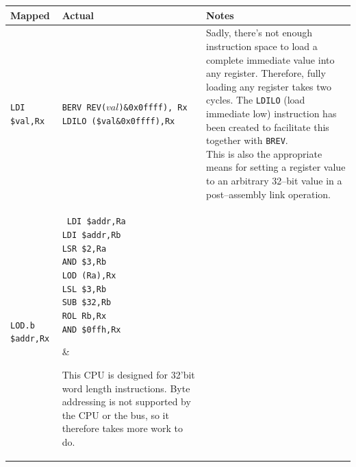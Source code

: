 \documentclass{gqtekspec}
\begin{document}
\begin{table}\begin{center}
\begin{tabular}{p{1.4in}p{1.5in}p{3in}}\\\hline
Mapped & Actual  & Notes \\\hline
{\tt LDI \$val,Rx }
	& \parbox[t]{1.8in}{\tt BERV REV($val$)\&0x0ffff), Rx \\
			LDILO (\$val\&0x0ffff),Rx}
	& \parbox[t]{3.0in}{Sadly, there's not enough instruction
		space to load a complete immediate value into any register.
		Therefore, fully loading any register takes two cycles.
		The {\tt LDILO} (load immediate low) instruction has been
		created to facilitate this together with {\tt BREV}.
		\\
	This is also the appropriate means for setting a register value
	to an arbitrary 32--bit value in a post--assembly link
	operation.}\\\hline
{\tt LOD.b \$addr,Rx}
	& \parbox[t]{1.5in}{\tt %
	LDI	\$addr,Ra \\
	LDI	\$addr,Rb \\
	LSR	\$2,Ra \\
	AND	\$3,Rb \\
	LOD	(Ra),Rx \\
	LSL	\$3,Rb \\
	SUB	\$32,Rb \\
	ROL	Rb,Rx \\
	AND \$0ffh,Rx}
	& \parbox[t]{3in}{This CPU is designed for 32'bit word
	length instructions.  Byte addressing is not supported by the CPU or
	the bus, so it therefore takes more work to do. 

}
\end{tabular}
\end{center}
\end{table}
\end{document}
